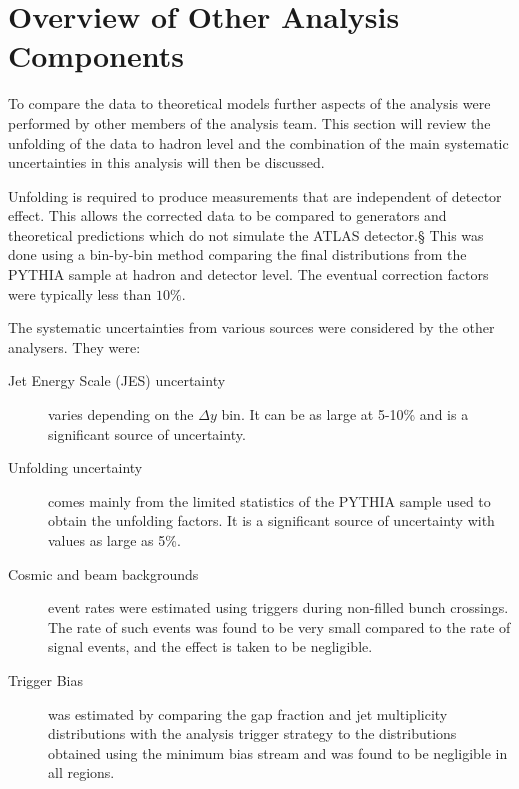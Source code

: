 \section{Overview of Other Analysis Components}
\label{sec:GBJ1:OtherWork}
To compare the data to theoretical models further aspects of the analysis were performed by other members of the analysis team. 
This section will review the unfolding of the data to hadron level and the combination of the main systematic uncertainties in this analysis will then be discussed.

Unfolding is required to produce measurements that are independent of detector effect.
This allows the corrected data to be compared to generators and theoretical predictions which do not simulate the ATLAS detector.§
This was done using a bin-by-bin method comparing the final distributions from the PYTHIA sample at hadron and detector level.
The eventual correction factors were typically less than $10\%$.


The systematic uncertainties from various sources were considered by the other analysers. 
They were:
\begin{description}
\item[Jet Energy Scale (JES) uncertainty] varies depending on the $\Delta y$ bin. 
It can be as large at 5-10\% and is a significant source of uncertainty.

\item[Unfolding uncertainty] comes mainly from the limited statistics of the PYTHIA sample used to obtain the unfolding factors. 
It is a significant source of uncertainty with values as large as 5\%.

\item[Cosmic and beam backgrounds] event rates were estimated using triggers during non-filled bunch crossings. 
The rate of such events was found to be very small compared to the rate of signal events, and the effect is taken to be negligible.

\item[Trigger Bias] was estimated by comparing the gap fraction and jet multiplicity distributions with the analysis trigger strategy to the distributions obtained using the minimum bias stream and was found to be negligible in all regions.

\end{description}


